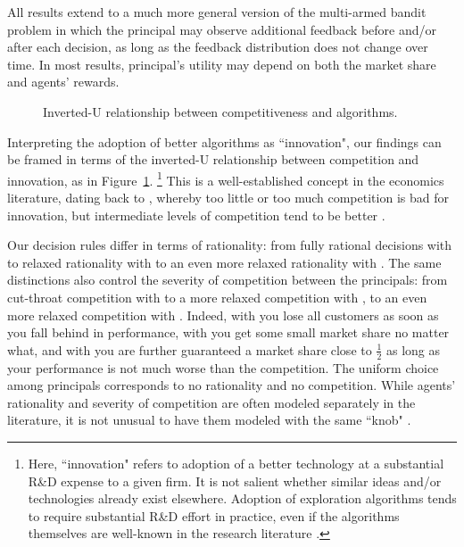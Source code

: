 All results extend to a much more general version of the multi-armed bandit problem in which the principal may observe additional feedback before and/or after each decision, as long as the feedback distribution does not change over time. In most results, principal's utility may depend on both the market share and agents' rewards.

\begin{figure}
\begin{center}

\caption{Inverted-U relationship between competitiveness and algorithms.}
\label{fig:inverted-U}
\end{center}
\end{figure}


Interpreting the adoption of better algorithms as ``innovation", our findings can be framed in terms of the inverted-U relationship between competition and innovation, as in Figure~\ref{fig:inverted-U}.%
\footnote{Here, ``innovation" refers to adoption of a better technology at a substantial R\&D expense to a given firm. It is not salient whether similar ideas and/or technologies already exist elsewhere. Adoption of exploration algorithms tends to require substantial R\&D effort in practice, even if the algorithms themselves are well-known in the research literature \citep[\eg see][]{DS-arxiv}.}
This is a well-established concept in the economics literature, dating back to \cite{Schumpeter-42}, whereby too little or too much competition is bad for innovation, but intermediate levels of competition tend to be better \citep[\eg][]{Aghion-QJE05,Vives-08}.

Our decision rules differ in terms of rationality: from fully rational decisions with \HardMax to relaxed rationality with \HardMaxRandom to an even more relaxed rationality with \SoftMaxRandom. The same distinctions also control the severity of competition between the principals: from cut-throat competition with \HardMax to a more relaxed competition with \HardMaxRandom, to an even more relaxed competition with \SoftMaxRandom. Indeed, with \HardMax you lose all customers as soon as you fall behind in performance, with \HardMaxRandom you get some small market share no matter what, and with \SoftMaxRandom you are further guaranteed a market share close to $\tfrac12$ as long as your performance is not much worse than the competition. The uniform choice among principals corresponds to no rationality and no competition. While agents' rationality and severity of competition are often modeled separately in the literature, it is not unusual to have them modeled with the same ``knob" \cite[\eg][]{Gabaix-16}.


